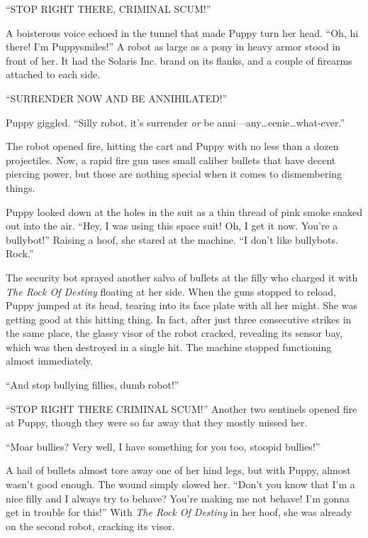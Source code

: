 ``STOP RIGHT THERE, CRIMINAL SCUM!''

A boisterous voice echoed in the tunnel that made Puppy turn her head. ``Oh, hi there! I'm Puppysmiles!'' A robot as large as a pony in heavy armor stood in front of her. It had the Solaris Inc. brand on its flanks, and a couple of firearms attached to each side.

``SURRENDER NOW AND BE ANNIHILATED!''


Puppy giggled. ``Silly robot, it's surrender \emph{or}\/ be anni---any\dots eenie\dots what-ever.''


The robot opened fire, hitting the cart and Puppy with no less than a dozen projectiles. Now, a rapid fire gun uses small caliber bullets that have decent piercing power, but those are nothing special when it comes to dismembering things.

Puppy looked down at the holes in the suit as a thin thread of pink smoke snaked out into the air. ``Hey, I was using this space suit! Oh, I get it now. You're a bullybot!'' Raising a hoof, she stared at the machine. ``I don't like bullybots. Rock.''

The security bot sprayed another salvo of bullets at the filly who charged it with \emph{The Rock Of Destiny}\/ floating at her side. When the guns stopped to reload, Puppy jumped at its head, tearing into its face plate with all her might. She was getting good at this hitting thing. In fact, after just three consecutive strikes in the same place, the glassy visor of the robot cracked, revealing its sensor bay, which was then destroyed in a single hit. The machine stopped functioning almost immediately.

``And stop bullying fillies, dumb robot!''

``STOP RIGHT THERE CRIMINAL SCUM!'' Another two sentinels opened fire at Puppy, though they were so far away that they mostly missed her.

``Moar bullies? Very well, I have something for you too, stoopid bullies!''

A hail of bullets almost tore away one of her hind legs, but with Puppy, almost wasn't good enough. The wound simply slowed her. ``Don't you know that I'm a nice filly and I always try to behave? You're making me not behave! I'm gonna get in trouble for this!'' With \emph{The Rock Of Destiny}\/ in her hoof, she was already on the second robot, cracking its visor.


